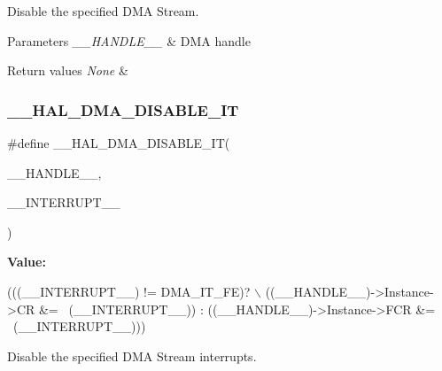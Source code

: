 Disable the specified D\+MA Stream. 


\begin{DoxyParams}{Parameters}
{\em \+\_\+\+\_\+\+H\+A\+N\+D\+L\+E\+\_\+\+\_\+} & D\+MA handle \\
\hline
\end{DoxyParams}

\begin{DoxyRetVals}{Return values}
{\em None} & \\
\hline
\end{DoxyRetVals}
\mbox{\label{group___d_m_a_ga2867eab09398df2daac55c3f327654da}} 
\subsubsection{\texorpdfstring{\+\_\+\+\_\+\+H\+A\+L\+\_\+\+D\+M\+A\+\_\+\+D\+I\+S\+A\+B\+L\+E\+\_\+\+IT}{\_\_HAL\_DMA\_DISABLE\_IT}}
{\footnotesize\ttfamily \#define \+\_\+\+\_\+\+H\+A\+L\+\_\+\+D\+M\+A\+\_\+\+D\+I\+S\+A\+B\+L\+E\+\_\+\+IT(\begin{DoxyParamCaption}\item[{}]{\+\_\+\+\_\+\+H\+A\+N\+D\+L\+E\+\_\+\+\_\+,  }\item[{}]{\+\_\+\+\_\+\+I\+N\+T\+E\+R\+R\+U\+P\+T\+\_\+\+\_\+ }\end{DoxyParamCaption})}

{\bfseries Value\+:}
\begin{DoxyCode}
(((\_\_INTERRUPT\_\_) != DMA\_IT\_FE)? \(\backslash\)
((\_\_HANDLE\_\_)->Instance->CR &= ~(\_\_INTERRUPT\_\_)) : ((\_\_HANDLE\_\_)->Instance->FCR &= ~(\_\_INTERRUPT\_\_)))
\end{DoxyCode}


Disable the specified D\+MA Stream interrupts. 


